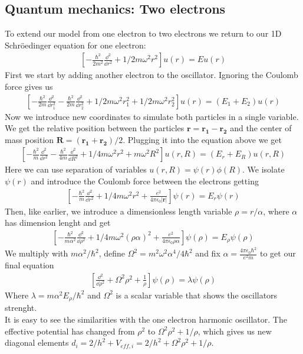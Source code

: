 \documentclass[american,a4paper,12pt]{article}
\renewcommand{\vec}[1]{\mathbf{#1}} %
\begin{document}
\subsection{Quantum mechanics: Two electrons}
To extend our model from one electron to two electrons we return to our 1D Schröedinger equation for one electron:
\begin{align*}
    \left[ -\frac{\hbar^2}{2m^2} \frac{\dd^2}{\dd r^2} + 1/2 m\omega^2 r^2 \right] u(r) = E u(r)
\end{align*}
First we start by adding another electron to the oscillator. Ignoring the Coulomb force gives us
\begin{align*}
    \left[ -\frac{\hbar^2}{2m} \frac{\dd^2}{\dd r_1^2} -\frac{\hbar^2}{2m} \frac{\dd^2}{\dd r_2^2} + 1/2 m\omega^2 r_1^2 + 1/2 m\omega^2 r_2^2 \right] u(r) = (E_1+E_2) u(r)
\end{align*}
Now we introduce new coordinates to simulate both particles in a single variable. We get the relative position between the particles $\vec{r}=\vec{r_1}-\vec{r_2}$ and the center of mass position $\vec{R}=(\vec{r_1}+\vec{r_2})/2$. Plugging it into the equation above we get
\begin{align*}
   \left[ -\frac{\hbar^2}{m} \frac{\dd^2}{\dd r^2} -\frac{\hbar^2}{4m} \frac{\dd^2}{\dd R^2} + 1/4 m\omega^2 r^2 + m\omega^2 R^2 \right] u(r,R) = (E_r+E_R) u(r,R)
\end{align*}
Here we can use separation of variables $u(r,R)=\psi(r)\phi(R)$. We isolate $\psi(r)$ and introduce the Coulomb force between the electrons getting
\begin{align*}
   \left[ -\frac{\hbar^2}{m} \frac{\dd^2}{\dd r^2} + 1/4 m\omega^2 r^2 + \frac{e^2}{4 \pi \epsilon_0 |\vec{r}|} \right] \psi(r) = E_r \psi(r)
\end{align*}
Then, like earlier, we introduce a dimensionless length variable $\rho = r/\alpha$, where $\alpha$ has dimension lenght and get
\begin{align*}
   \left[ -\frac{\hbar^2}{m \alpha^2} \frac{\dd^2}{\dd \rho^2} + 1/4 m\omega^2 (\rho \alpha)^2 + \frac{e^2}{4 \pi \epsilon_0 \rho \alpha} \right] \psi(\rho) = E_\rho \psi(\rho)
\end{align*}
We multiply with $m\alpha^2/\hbar^2$, define $\Omega^2=m^2 \omega^2 \alpha^4/4\hbar^2 $ and fix $\alpha = \frac{4 \pi \epsilon_0 \hbar^2}{e^2 m}$ to get our final equation
\begin{align*}
   \left[ \frac{\dd^2}{\dd \rho^2} +\Omega^2 \rho^2 + \frac{1}{\rho} \right] \psi(\rho) = \lambda \psi(\rho)
\end{align*}
Where $\lambda=m \alpha^2 E_\rho/\hbar^2$ and $\Omega^2$ is a scalar variable that shows the oscillators strenght.\\
It is easy to see the similarities with the one electron harmonic oscillator. The effective potential has changed from $\rho^2$ to $\Omega^2 \rho^2 + 1/\rho$, which gives us new diagonal elements $d_i = 2/h^2 + V_{eff,i} = 2/h^2 + \Omega^2 \rho^2 +1/\rho$.
\end{document}
